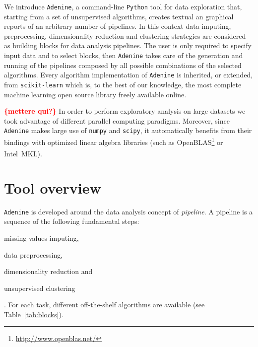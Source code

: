 \documentclass[twoside,11pt]{article}
\makeatletter
\newcommand{\ade}{\texttt{Adenine}\@\xspace}
\newcommand{\py}{\texttt{Python}\@\xspace}
\newcommand{\todo}[1]{\textcolor{red}{{\bf \{#1\}}}} %
\makeatother
\begin{document}
We introduce \ade, a command-line \py tool for data exploration that, starting from a set of unsupervised algorithms, creates textual an graphical reports of an arbitrary number of pipelines. In this context data imputing, preprocessing, dimensionality reduction and clustering strategies are considered as building blocks for data analysis pipelines. The user is only required to specify input data and to select blocks, then \ade takes care of the generation and running of the pipelines composed by all possible combinations of the selected algorithms. Every algorithm implementation of \ade is inherited, or extended, from \texttt{scikit-learn} \citep{scikit-learn} which is, to the best of our knowledge, the most complete machine learning open source library freely available online.

\todo{mettere qui?}
In order to perform exploratory analysis on large datasets we took advantage of different parallel computing paradigms. %
Moreover, since \ade makes large use of \texttt{numpy} and \texttt{scipy}, it automatically benefits from their bindings with optimized linear algebra libraries (such as OpenBLAS\footnote{\url{http://www.openblas.net/}} or Intel\textsuperscript{\textregistered}~MKL).

\section{Tool overview}\label{sec:implem}
\ade is developed around the data analysis concept of \emph{pipeline}. A pipeline is a sequence of the following fundamental steps:
\begin{enumerate*}[label=(\roman*)]
  \item missing values imputing,
  \item data preprocessing,
  \item dimensionality reduction and
  \item unsupervised clustering
\end{enumerate*}. 
For each task, different off-the-shelf algorithms are available (see Table~\ref{tab:blocks}).%

\end{document}
